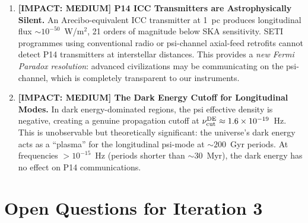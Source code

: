 \documentclass[11pt]{article}
\newcommand{\ee}[1]{\times 10^{#1}}
\begin{document}
\begin{enumerate}[leftmargin=*]
\item \textbf{[IMPACT: MEDIUM] P14 ICC Transmitters are Astrophysically Silent.}
An Arecibo-equivalent ICC transmitter at 1~pc produces longitudinal
flux $\sim 10^{-50}$~W/m$^2$, 21 orders of magnitude below SKA
sensitivity. SETI programmes using conventional radio or psi-channel
axial-feed retrofits cannot detect P14 transmitters at interstellar
distances. This provides a \textit{new Fermi Paradox resolution}:
advanced civilizations may be communicating on the psi-channel,
which is completely transparent to our instruments.

\item \textbf{[IMPACT: MEDIUM] The Dark Energy Cutoff for Longitudinal Modes.}
In dark energy-dominated regions, the psi effective density is
negative, creating a genuine propagation cutoff at
$\nu_{\rm cut}^{\rm DE} \approx 1.6\ee{-19}$~Hz. This is unobservable
but theoretically significant: the universe's dark energy acts as a
``plasma'' for the longitudinal psi-mode at $\sim 200$~Gyr periods.
At frequencies $> 10^{-15}$~Hz (periods shorter than $\sim 30$~Myr),
the dark energy has no effect on P14 communications.

\end{enumerate}

\section{Open Questions for Iteration 3}
\label{sec:open-questions}
\end{document}
